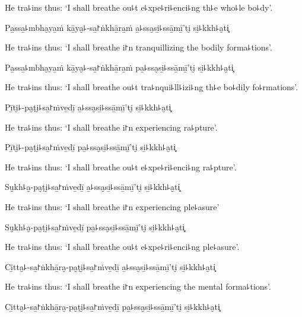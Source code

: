 \begin{english}
  He tra꜕ins thus: `I shall breathe ou꜕t e꜕xpe꜕ri꜕enci꜕ng th꜕e who꜕le bo꜕dy'.
\end{english}

Pa̱ssa̱꜕mbha̮ya̱ṁ kā̱ya̮꜕-sa̱꜓ṅkhā̱ra̱ṁ a̱꜕ssa̮si̱꜕ssā̱mī̱'ti̮ si̱꜕kkh꜕a̮ti͓

\begin{english}
  He tra꜕ins thus: `I shall breathe i꜓n tranquillizing the bodily forma꜕tions'.
\end{english}

Pa̱ssa̱꜕mbha̮ya̱ṁ kā̱ya̮꜕-sa̱꜓ṅkhā̱ra̱ṁ pa̱꜕ssa̮si̱꜕ssā̱mī̱'ti̮ si̱꜕kkh꜕a̮ti͓

\begin{english}
  He tra꜕ins thus: `I shall breathe ou꜕t tra꜕nqui꜕ll꜕izi꜕ng th꜕e bo꜕dily fo꜕rmations'.
\end{english}

Pī̱ti̮꜕-pa̮ṭi̮꜕sa̱꜓ṁve̱dī̱ a̱꜕ssa̮si̱꜕ssā̱mī̱'ti̮ si̱꜕kkh꜕a̮ti͓

\begin{english}
  He tra꜕ins thus: `I shall breathe i꜓n experiencing ra꜕pture'.
\end{english}

Pī̱ti̮꜕-pa̮ṭi̮꜕sa̱꜓ṁve̱dī̱ pa̱꜕ssa̮si̱꜕ssā̱mī̱'ti̮ si̱꜕kkh꜕a̮ti͓

\begin{english}
  He tra꜕ins thus: `I shall breathe ou꜕t e꜕xpe꜕ri꜕enci꜕ng ra꜕pture'.
\end{english}

Su̮kh꜕a̮-pa̮ṭi̮꜕sa̱꜓ṁve̱dī̱ a̱꜕ssa̮si̱꜕ssā̱mī̱'ti̮ si̱꜕kkh꜕a̮ti͓

\begin{english}
  He tra꜕ins thus: `I shall breathe i꜓n experiencing ple꜕asure'
\end{english}

Su̮kh꜕a̮-pa̮ṭi̮꜕sa̱꜓ṁve̱dī̱ pa̱꜕ssa̮si̱꜕ssā̱mī̱'ti̮ si̱꜕kkh꜕a̮ti͓

\begin{english}
  He tra꜕ins thus: `I shall breathe ou꜕t e꜕xpe꜕ri꜕enci꜕ng ple꜕asure'.
\end{english}

Ci̱tta̮꜕-sa̱꜓ṅkhā̱ra̮-pa̮ṭi̮꜕sa̱꜓ṁve̱dī̱ a̱꜕ssa̮si̱꜕ssā̱mī̱'ti̮ si̱꜕kkh꜕a̮ti͓

\begin{english}
  He tra꜕ins thus: `I shall breathe i꜓n experiencing the mental forma꜕tions'.
\end{english}

Ci̱tta̮꜕-sa̱꜓ṅkhā̱ra̮-pa̮ṭi̮꜕sa̱꜓ṁve̱dī̱ pa̱꜕ssa̮si̱꜕ssā̱mī̱'ti̮ si̱꜕kkh꜕a̮ti͓

